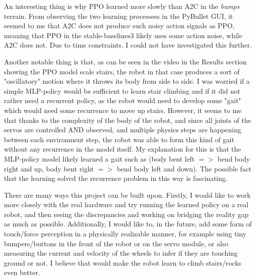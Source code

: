 \documentclass{article}
\begin{document}
An interesting thing is why PPO learned more slowly than A2C in the \textit{bumps} terrain.
From observing the two learning processess in the PyBullet GUI, it seemed to me that A2C does not produce such noisy action signals as PPO, meaning that PPO in the stable-baselines3 likely uses some action noise, while A2C does not.
Due to time constraints, I could not have investigated this further.

Another notable thing is that, as can be seen in the video in the Results section showing the PPO model scale stairs, the robot in that case produces a sort of "oscillatory" motion where it throws its body from side to side.
I was worried if a simple MLP-policy would be sufficient to learn stair climbing and if it did not rather need a recurrent policy, as the robot would need to develop some "gait" which would need some recurrence to move up stairs.
However, it seems to me that thanks to the complexity of the body of the robot, and since all joints of the servos are controlled AND observed, and multiple physics steps are happening between each environment step, the robot was able to form this kind of gait without any recurrence in the model itself.
My explanation for this is that the MLP-policy model likely learned a gait such as (body bent left $=>$ bend body right and up, body bent right $=>$ bend body left and down).
The possible fact that the learning solved the recurrence problem in this way is fascinating.

There are many ways this project can be built upon.
Firstly, I would like to work more closely with the real hardware and try running the learned policy on a real robot, and then seeing the discrepancies and working on bridging the reality gap as much as possible. 
Additionally, I would like to, in the future, add some form of touch/force perception in a physically realizable manner, for example using tiny bumpers/buttons in the front of the robot or on the servo module, or also measuring the current and velocity of the wheels to infer if they are touching ground or not.
I believe that would make the robot learn to climb stairs/rocks even better.



% 

% 

\end{document}
